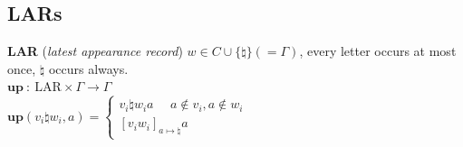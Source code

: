 \subsection*{LARs}
\textbf{LAR} (\textit{latest appearance record}) $w \in C \cup \{\natural\} (=\Gamma)$, every letter occurs at most once, $\natural$ occurs always.\\
$\textbf{up}\ :\ \text{LAR} \times \Gamma \rightarrow \Gamma$\\
$\textbf{up}(v_i \natural w_i, a) = \begin{cases}
	v_i \natural w_i a\ \ \ \ \ \ a \not\in v_i, a \not\in w_i\\
	[v_iw_i]_{a \mapsto \natural}a
\end{cases}$
